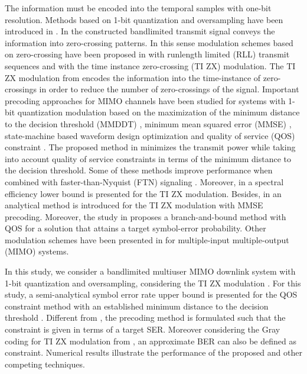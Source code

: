The information must be encoded into the temporal samples with one-bit resolution. {Methods based on 1-bit quantization and oversampling have been introduced in \cite{Landau_2014, Son_2019,1bitcpm,dynovs}}. In \cite{Shamai2_1994} the constructed bandlimited transmit signal conveys the information into zero-crossing patterns. In this sense modulation schemes based on zero-crossing have been proposed in \cite{Peter_2021, Peter_2020, Bender_2019} with runlength limited (RLL) transmit sequences and \cite{Viveros_2023} with the time instance zero-crossing (TI ZX) modulation. The TI ZX modulation from \cite{Viveros_2023} encodes the information into the time-instance of zero-crossings in order to reduce the number of zero-crossings of the signal. Important precoding approaches for MIMO channels have been studied for systems with 1-bit quantization modulation based on the maximization of the minimum distance to the decision threshold (MMDDT) \cite{Viveros_2023}, minimum mean squared error (MMSE) \cite{Viveros_2023, Amine_2016, Jacobson_2016}, state-machine based waveform design optimization \cite{Viveros_2024} and quality of service (QOS) constraint \cite{Viveros_ssp_2021}. The proposed method in \cite{Viveros_ssp_2021}  minimizes the transmit power while taking into account quality of service constraints in terms of the minimum distance to the decision threshold. Some of these methods improve performance when combined with faster-than-Nyquist (FTN) signaling \cite{Mazo_1975}. Moreover, in \cite{Viveros_2023} a spectral efficiency lower bound is presented for the TI ZX modulation. Besides, in \cite{Viveros_2023} an analytical method is introduced for the TI ZX modulation with MMSE precoding. {Moreover, the study in \cite{Erico_2023} proposes a branch-and-bound method with  QOS for a solution that attains a target symbol-error probability}. \textcolor{r}{Other modulation schemes have been presented in \cite{mohamed_2017} for multiple-input multiple-output (MIMO) systems.}

 In this study, we consider a bandlimited multiuser MIMO downlink system with 1-bit quantization and oversampling, considering the TI ZX modulation \cite{Viveros_2023}. For this study, a semi-analytical symbol error rate upper bound is presented for the QOS constraint method with an established minimum distance to the decision threshold \cite{Viveros_ssp_2021}. {Different from \cite{Viveros_ssp_2021}, the precoding method is formulated such that the constraint is given in terms of a target  SER. Moreover considering the Gray coding for TI ZX modulation from \cite{Viveros_2023}, an approximate BER can also be defined as constraint. Numerical results illustrate the performance of the proposed and other competing techniques.} 
 
